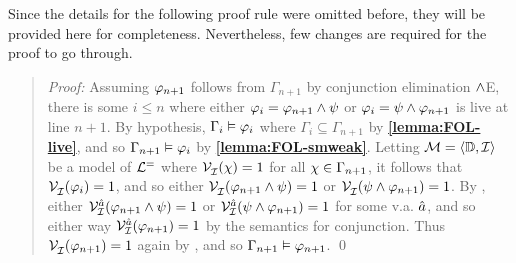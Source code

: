 
Since the details for the following proof rule were omitted before, they will be provided here for completeness.
Nevertheless, few changes are required for the proof to go through.


\begin{quote} 
  \textit{Proof:} Assuming $\varphi_{n+1}$ follows from $\Gamma_{n+1}$ by conjunction elimination $\wedge$E, there is some $i\leq n$ where either $\varphi_i=\varphi_{n+1}\wedge\psi$ or $\varphi_i=\psi\wedge\varphi_{n+1}$ is live at line $n+1$.
  By hypothesis, $\Gamma_i\vDash \varphi_i$ where $\Gamma_i\subseteq \Gamma_{n+1}$ by \textbf{\ref{lemma:FOL-live}}, and so $\Gamma_{n+1} \vDash \varphi_i$ by \textbf{\ref{lemma:FOL-smweak}}.
  Letting $\mathcal{M}=\langle\mathbb{D},\mathcal{I}\rangle$ be a model of $\mathcal{L}^{=}$ where $\mathcal{V}_{\mathcal{I}}^{}(\chi) = 1$ for all $\chi \in \Gamma_{n+1}$, it follows that $\mathcal{V}_{\mathcal{I}}^{}(\varphi_i) = 1$, and so either $\mathcal{V}_{\mathcal{I}}^{}(\varphi_{n+1}\wedge\psi) = 1$ or $\mathcal{V}_{\mathcal{I}}^{}(\psi\wedge\varphi_{n+1}) = 1$.
  By , either $\mathcal{V}_{\mathcal{I}}^{\hat{a}}(\varphi_{n+1}\wedge\psi)=1$ or $\mathcal{V}_{\mathcal{I}}^{\hat{a}}(\psi\wedge\varphi_{n+1})=1$ for some v.a. $\hat{a}$, and so either way $\mathcal{V}_{\mathcal{I}}^{\hat{a}}(\varphi_{n+1})=1$ by the semantics for conjunction.
  Thus $\mathcal{V}_{\mathcal{I}}^{}(\varphi_{n+1}) = 1$ again by , and so $\Gamma_{n+1} \vDash \varphi_{n+1}$.
  \qed
\end{quote}






